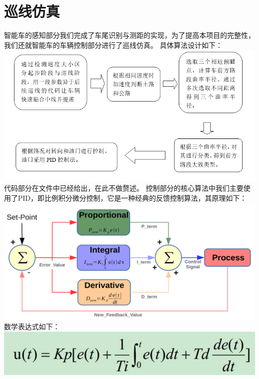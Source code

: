 \documentclass{article}
\begin{document}
\section{巡线仿真}
智能车的感知部分我们完成了车尾识别与测距的实现，为了提高本项目的完整性，我们还就智能车的车辆控制部分进行了巡线仿真。
\newline\newline
具体算法设计如下：
\newline
\includegraphics[scale=0.5]{cc.png}
\\代码部分在文件中已经给出，在此不做赘述。
\newline\newline
控制部分的核心算法中我们主要使用了PID，即比例积分微分控制，它是一种经典的反馈控制算法，其原理如下：
\newline 
\includegraphics[scale=0.5]{pid.png}
\newline
数学表达式如下：
\newline
\includegraphics[scale=0.5]{PID2.png}
\newline\newline
\end{document}
